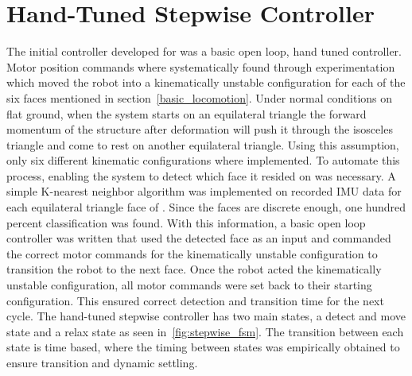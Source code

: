 


\section{Hand-Tuned Stepwise Controller}
The initial controller developed for \SB{} was a basic open loop, hand tuned controller.
Motor position commands where systematically found through experimentation which moved the robot into a kinematically unstable configuration for each of the six faces mentioned in section~\ref{basic_locomotion}.
Under normal conditions on flat ground, when the system starts on an equilateral triangle the forward momentum of the structure after deformation will push it through the isosceles triangle and come to rest on another equilateral triangle.
Using this assumption, only six different kinematic configurations where implemented.
To automate this process, enabling the system to detect which face it resided on was necessary.
A simple K-nearest neighbor algorithm was implemented on recorded IMU data for each equilateral triangle face of \SB{}.
Since the faces are discrete enough, one hundred percent classification was found.
With this information, a basic open loop controller was written that used the detected face as an input and commanded the correct motor commands for the kinematically unstable configuration to transition the robot to the next face.
Once the robot acted the kinematically unstable configuration, all motor commands were set back to their starting configuration.
This ensured correct detection and transition time for the next cycle.
The hand-tuned stepwise controller has two main states, a detect and move state and a relax state as seen in~\ref{fig:stepwise_fsm}.
The transition between each state is time based, where the timing between states was empirically obtained to ensure transition and dynamic settling.

